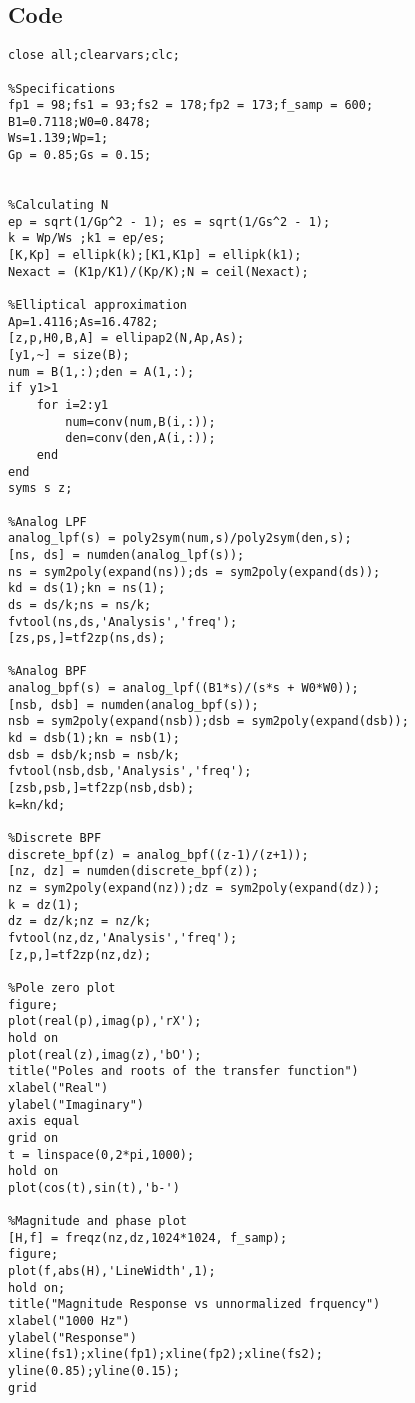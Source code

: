 \documentclass[12pt]{article}
\begin{document}
\subsection{Code}
\begin{verbatim}
close all;clearvars;clc;

%Specifications
fp1 = 98;fs1 = 93;fs2 = 178;fp2 = 173;f_samp = 600;
B1=0.7118;W0=0.8478;
Ws=1.139;Wp=1;
Gp = 0.85;Gs = 0.15;


%Calculating N
ep = sqrt(1/Gp^2 - 1); es = sqrt(1/Gs^2 - 1);
k = Wp/Ws ;k1 = ep/es;
[K,Kp] = ellipk(k);[K1,K1p] = ellipk(k1);
Nexact = (K1p/K1)/(Kp/K);N = ceil(Nexact); 

%Elliptical approximation
Ap=1.4116;As=16.4782;
[z,p,H0,B,A] = ellipap2(N,Ap,As);
[y1,~] = size(B);
num = B(1,:);den = A(1,:);
if y1>1
    for i=2:y1
        num=conv(num,B(i,:));
        den=conv(den,A(i,:));
    end
end
syms s z;

%Analog LPF
analog_lpf(s) = poly2sym(num,s)/poly2sym(den,s);  
[ns, ds] = numden(analog_lpf(s));                                    
ns = sym2poly(expand(ns));ds = sym2poly(expand(ds));                     
kd = ds(1);kn = ns(1);    
ds = ds/k;ns = ns/k;
fvtool(ns,ds,'Analysis','freq');                       
[zs,ps,]=tf2zp(ns,ds);

%Analog BPF
analog_bpf(s) = analog_lpf((B1*s)/(s*s + W0*W0));   
[nsb, dsb] = numden(analog_bpf(s));                                      
nsb = sym2poly(expand(nsb));dsb = sym2poly(expand(dsb));                 
kd = dsb(1);kn = nsb(1);    
dsb = dsb/k;nsb = nsb/k;
fvtool(nsb,dsb,'Analysis','freq');                       
[zsb,psb,]=tf2zp(nsb,dsb);
k=kn/kd;

%Discrete BPF
discrete_bpf(z) = analog_bpf((z-1)/(z+1));              
[nz, dz] = numden(discrete_bpf(z));                                        
nz = sym2poly(expand(nz));dz = sym2poly(expand(dz));                    
k = dz(1);    
dz = dz/k;nz = nz/k;
fvtool(nz,dz,'Analysis','freq');                       
[z,p,]=tf2zp(nz,dz);

%Pole zero plot
figure;
plot(real(p),imag(p),'rX');
hold on
plot(real(z),imag(z),'bO');
title("Poles and roots of the transfer function")
xlabel("Real")
ylabel("Imaginary")
axis equal
grid on
t = linspace(0,2*pi,1000);
hold on
plot(cos(t),sin(t),'b-') 

%Magnitude and phase plot
[H,f] = freqz(nz,dz,1024*1024, f_samp);
figure;
plot(f,abs(H),'LineWidth',1);
hold on;
title("Magnitude Response vs unnormalized frquency")
xlabel("1000 Hz")
ylabel("Response")
xline(fs1);xline(fp1);xline(fp2);xline(fs2);
yline(0.85);yline(0.15);
grid
\end{verbatim}
\end{document}
